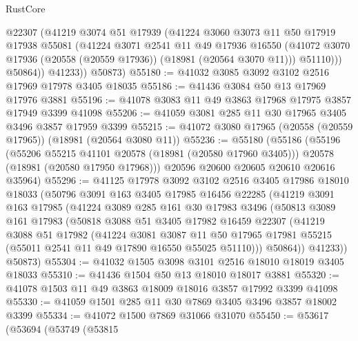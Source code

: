 \begin{lexlean}{RustCore}
\begin{coremodule}
              @22307
              (@41219
                @3074
                @51
                @17939
                (@41224
                  @3060
                  @3073
                  @11
                  @50
                  @17919
                  @17938
                  @55081
                  (@41224
                    @3071
                    @2541
                    @11
                    @49
                    @17936
                    @16550
                    (@41072 @3070 @17936 (@20558 (@20559 @17936)) (@18981 (@20564 @3070 @11)))
                    @51110)))
              @50864))
          @41233))
      @50873)
@55180 := @41032 @3085 @3092 @3102 @2516 @17969 @17978 @3405 @18035
@55186 := @41436 @3084 @50 @13 @17969 @17976 @3881
@55196 := @41078 @3083 @11 @49 @3863 @17968 @17975 @3857 @17949 @3399 @41098
@55206 := @41059 @3081 @285 @11 @30 @17965 @3405 @3496 @3857 @17959 @3399
@55215 := @41072 @3080 @17965 (@20558 (@20559 @17965)) (@18981 (@20564 @3080 @11))
@55236 := @55180
    (@55186
      (@55196
        (@55206 @55215 @41101 @20578 (@18981 (@20580 @17960 @3405)))
        @20578
        (@18981 (@20580 @17950 @17968)))
      @20596
      @20600
      @20605
      @20610
      @20616
      @35964)
@55296 := @41125
    @17978
    @3092
    @3102
    @2516
    @3405
    @17986
    @18010
    @18033
    (@50796
      @3091
      @163
      @3405
      @17985
      @16456
      @22285
      (@41219
        @3091
        @163
        @17985
        (@41224
          @3089
          @285
          @161
          @30
          @17983
          @3496
          (@50813
            @3089
            @161
            @17983
            (@50818
              @3088
              @51
              @3405
              @17982
              @16459
              @22307
              (@41219
                @3088
                @51
                @17982
                (@41224
                  @3081
                  @3087
                  @11
                  @50
                  @17965
                  @17981
                  @55215
                  (@55011 @2541 @11 @49 @17890 @16550 @55025 @51110)))
              @50864))
          @41233))
      @50873)
@55304 := @41032 @1505 @3098 @3101 @2516 @18010 @18019 @3405 @18033
@55310 := @41436 @1504 @50 @13 @18010 @18017 @3881
@55320 := @41078 @1503 @11 @49 @3863 @18009 @18016 @3857 @17992 @3399 @41098
@55330 := @41059 @1501 @285 @11 @30 @7869 @3405 @3496 @3857 @18002 @3399
@55334 := @41072 @1500 @7869 @31066 @31070
@55450 := @53617
    (@53694
      (@53749
        (@53815

\end{coremodule}
\end{lexlean}
